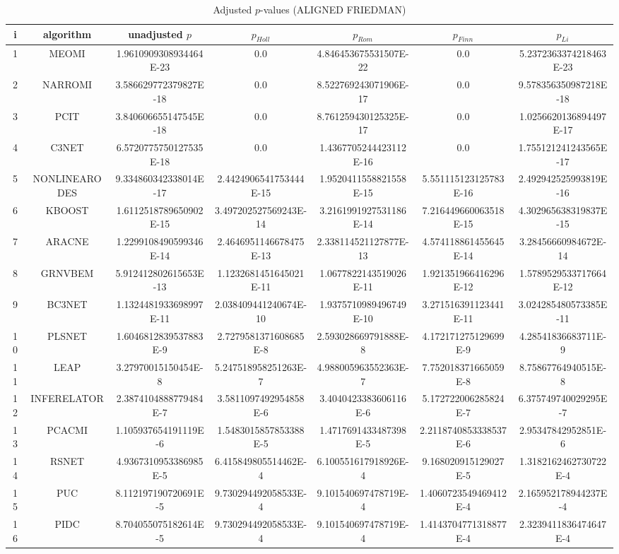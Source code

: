 \documentclass[a4paper,10pt]{article}
\begin{document}
\begin{landscape}
\begin{table}[!htp]
\centering\scriptsize
\caption{Adjusted $p$-values (ALIGNED FRIEDMAN)}
\begin{tabular}{ccccccc}
i&algorithm&unadjusted $p$&$p_{Holl}$&$p_{Rom}$&$p_{Finn}$&$p_{Li}$\\
\hline
1&MEOMI&1.9610909308934464E-23&0.0&4.846453675531507E-22&0.0&5.2372363374218463E-23\\
2&NARROMI&3.586629772379827E-18&0.0&8.522769243071906E-17&0.0&9.578356350987218E-18\\
3&PCIT&3.840606655147545E-18&0.0&8.761259430125325E-17&0.0&1.0256620136894497E-17\\
4&C3NET&6.5720775750127535E-18&0.0&1.4367705244423112E-16&0.0&1.755121241243565E-17\\
5&NONLINEARODES&9.334860342338014E-17&2.4424906541753444E-15&1.9520411558821558E-15&5.551115123125783E-16&2.492942525993819E-16\\
6&KBOOST&1.6112518789650902E-15&3.497202527569243E-14&3.2161991927531186E-14&7.216449660063518E-15&4.302965638319837E-15\\
7&ARACNE&1.2299108490599346E-14&2.4646951146678475E-13&2.338114521127877E-13&4.574118861455645E-14&3.28456660984672E-14\\
8&GRNVBEM&5.912412802615653E-13&1.1232681451645021E-11&1.0677822143519026E-11&1.921351966416296E-12&1.5789529533717664E-12\\
9&BC3NET&1.1324481933698997E-11&2.038409441240674E-10&1.9375710989496749E-10&3.271516391123441E-11&3.024285480573385E-11\\
10&PLSNET&1.6046812839537883E-9&2.7279581371608685E-8&2.593028669791888E-8&4.172171275129699E-9&4.28541836683711E-9\\
11&LEAP&3.27970015150454E-8&5.247518958251263E-7&4.988005963552363E-7&7.752018371665059E-8&8.75867764940515E-8\\
12&INFERELATOR&2.3874104888779484E-7&3.5811097492954858E-6&3.4040423383606116E-6&5.172722006285824E-7&6.375749740029295E-7\\
13&PCACMI&1.105937654191119E-6&1.5483015857853388E-5&1.4717691433487398E-5&2.2118740853338537E-6&2.95347842952851E-6\\
14&RSNET&4.9367310953386985E-5&6.415849805514462E-4&6.100551617918926E-4&9.168020915129027E-5&1.3182162462730722E-4\\
15&PUC&8.112197190720691E-5&9.730294492058533E-4&9.101540697478719E-4&1.4060723549469412E-4&2.165952178944237E-4\\
16&PIDC&8.704055075182614E-5&9.730294492058533E-4&9.101540697478719E-4&1.4143704771318877E-4&2.3239411836474647E-4\\

\end{tabular}
\end{table}
\end{landscape}
\end{document}
